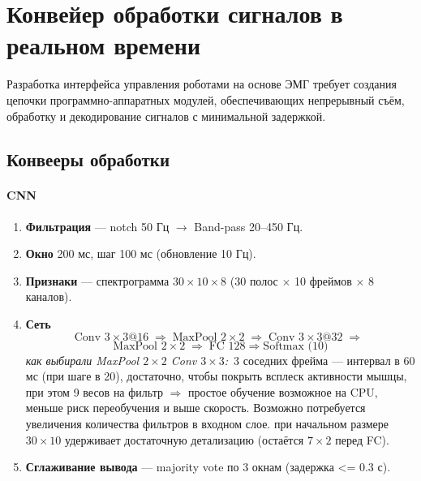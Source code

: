 \documentclass[12pt,a4paper]{article}
\begin{document}
\section{Конвейер обработки сигналов в реальном времени}
Разработка интерфейса управления роботами на основе ЭМГ требует создания цепочки программно-аппаратных модулей, обеспечивающих непрерывный съём, обработку и декодирование сигналов с минимальной задержкой.

\subsection{Конвееры обработки}

\paragraph{CNN}
\begin{enumerate}
  \item \textbf{Фильтрация} — notch 50 Гц $\to$ Band-pass 20–450 Гц.
  \item \textbf{Окно} 200 мс, шаг 100 мс  (обновление 10 Гц).
  \item \textbf{Признаки} — спектрограмма  
        $30{\times}10{\times}8$ (30 полос $\times$ 10 фреймов $\times$ 8 каналов).
  \item \textbf{Сеть}  
        \[
        \text{Conv }3{\times}3@16 \;\Rightarrow\; \boxed{\text{MaxPool }2{\times}2}\;
        \Rightarrow\; \text{Conv }3{\times}3@32 \;\Rightarrow\; \]
            \[
        \boxed{\text{MaxPool }2{\times}2}\;
        \Rightarrow\; \text{FC 128} \Rightarrow \text{Softmax (10)}
        \]
        \textit{как выбирали MaxPool $2{\times}2$ Conv $3{\times}3$:}\,  
        3 соседних фрейма — интервал в 60 мс (при шаге в 20), достаточно, чтобы покрыть всплеск активности мышцы, при этом 9 весов на фильтр $\Rightarrow$ простое обучение возможное на CPU,
        меньше риск переобучения и выше скорость. Возможно потребуется увеличения количества фильтров в входном слое.
        при начальном размере $30{\times}10$ удерживает
        достаточную детализацию (остаётся $7{\times}2$ перед FC).
  \item \textbf{Сглаживание вывода} — majority vote по 3 окнам (задержка <= 0.3 с).
\end{enumerate}

\vspace{0.8em}
\end{document}
